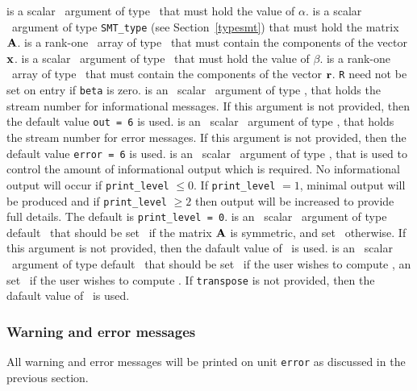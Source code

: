 \documentclass{galahad}
\begin{document}
\begin{description}
   is a scalar \intentin\ argument of type \realdp\ that
     must hold the value of $\alpha$.
   is a scalar \intentin\ argument of type {\tt SMT\_type} (see
     Section~\ref{typesmt}) that must hold the matrix ${\mathbf{A}}$.
   is a rank-one \intentin\ array of type \realdp\ that must
     contain the components of the vector ${\mathbf{x}}$.
   is a scalar \intentin\ argument of type \realdp\ that
     must hold the value of $\beta$.
   is a rank-one \intentinout\ array of type \realdp\ that must
  contain the components of the vector ${\mathbf{r}}$. {\tt R} need not be set
  on entry if {\tt beta} is zero.
   is an \optional\ scalar \intentin\ argument of type \integer, that holds the
     stream number for informational messages. If this argument is not
     provided, then the default value {\tt out = 6} is used.
   is an \optional\ scalar \intentin\ argument of type \integer, that holds the
     stream number for error messages. If this argument is not
     provided, then the default value {\tt error = 6} is used.
   is an \optional\ scalar \intentin\ argument of type \integer, that is used
     to control the amount of informational output which is required. No 
     informational output will occur if {\tt print\_level} $\leq 0$. If 
     {\tt print\_level} $= 1$, minimal output will be produced and if
     {\tt print\_level} $\geq 2$ then output will be
     increased to provide full details.
     The default is {\tt print\_level = 0}.
   is an \optional\ scalar \intentin\ argument of type default
     \logical\ that should be set \true\ if the matrix ${\mathbf{A}}$ is
     symmetric, and set \false\ otherwise.  If this argument is not
     provided, then the dafault value of \false\ is used. 
   is an \optional\ scalar \intentin\ argument of type default
     \logical\ that should be set \false\ if the user wishes to compute
     , an set \true\ if the user wishes to compute .
     If {\tt transpose} is not provided, then the dafault value of
     \false\ is used. 
\end{description}

\subsubsection{Warning and error messages}\label{Ax-error}

All warning and error messages will be printed on unit {\tt error} as
discussed in the previous section.
\end{document}
